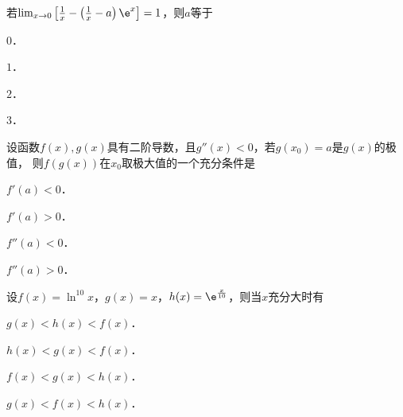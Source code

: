 \documentclass[plain,noanswer,medmath]{../../template/jnuexam}
\begin{document}






\begin{problem}
若$\lim_{x \to 0} \left[\frac{1}{x} - \left(\frac{1}{x} - a \right) \e^x \right] = 1$，则$a$等于\pickout{}
\begin{abcd}
\item $0$．
\item $1$．
\item $2$．
\item $3$．
\end{abcd}
\end{problem}




\begin{problem}
设函数$f(x),g(x)$具有二阶导数，且$g''(x) < 0$，若$g(x_0) = a$是$g(x)$的极值，
则$f(g(x))$在$x_0$取极大值的一个充分条件是\pickout{}
\begin{abcd}
\item $f'(a) < 0$．
\item $f'(a) > 0$．
\item $f''(a) < 0$．
\item $f''(a) > 0$．
\end{abcd}
\end{problem}


\begin{problem}
设$f(x) = \ln^{10} x$，$g(x) = x$，$h(x) = \e^{\frac{x}{10}}$，则当$x$充分大时有\pickout{}
\begin{abcd}
\item $g(x) < h(x) < f(x)$．
\item $h(x) < g(x) < f(x)$．
\item $f(x) < g(x) < h(x)$．
\item $g(x) < f(x) < h(x)$．
\end{abcd}
\end{problem}










\end{document}
